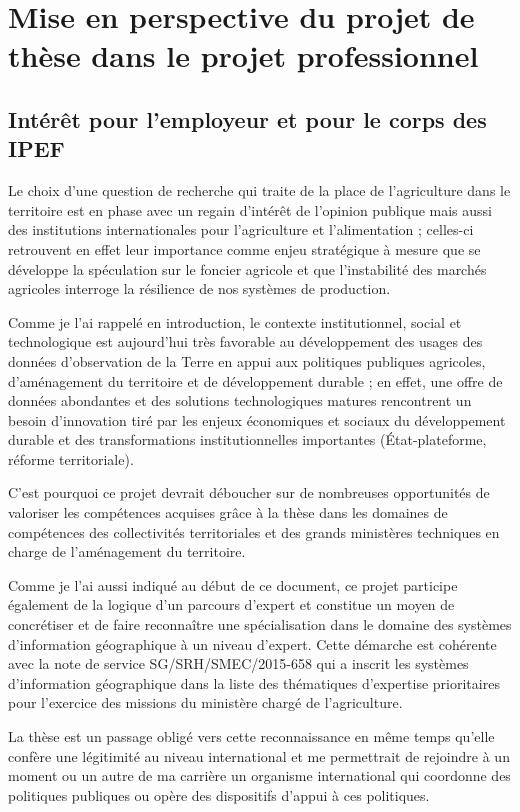 \section
{Mise en perspective du projet de thèse dans le projet professionnel}

\subsection
{Intérêt pour l'employeur et pour le corps des IPEF}

Le choix d'une question de recherche qui traite de la place de l'agriculture
dans le territoire est en phase avec un regain d'intérêt de l'opinion publique
mais aussi des institutions internationales pour l'agriculture et
l'alimentation ; celles-ci retrouvent en effet leur importance comme enjeu
stratégique à mesure que se développe la spéculation sur le foncier agricole
et que l'instabilité des marchés agricoles interroge la résilience de nos
systèmes de production.

Comme je l'ai rappelé en introduction, le contexte institutionnel, social et
technologique est aujourd'hui très favorable au développement des usages des
données d’observation de la Terre en appui aux politiques publiques agricoles,
d’aménagement du territoire et de développement durable ; en effet, une offre
de données abondantes et des solutions technologiques matures rencontrent un
besoin d'innovation tiré par les enjeux économiques et sociaux du
développement durable et des transformations institutionnelles importantes
(État-plateforme, réforme territoriale).

C'est pourquoi ce projet devrait déboucher sur de nombreuses opportunités de
valoriser les compétences acquises grâce à la thèse dans les domaines de
compétences des collectivités territoriales et des grands ministères
techniques en charge de l'aménagement du territoire.

Comme je l'ai aussi indiqué au début de ce document, ce projet participe
également de la logique d'un parcours d'expert et constitue un moyen de
concrétiser et de faire reconnaître une spécialisation dans le domaine des
systèmes d'information géographique à un niveau d'expert. Cette démarche est
cohérente avec la note de service SG/SRH/SMEC/2015-658 qui a inscrit les
systèmes d'information géographique dans la liste des thématiques d'expertise
prioritaires pour l'exercice des missions du ministère chargé de
l'agriculture.

La thèse est un passage obligé vers cette reconnaissance en même temps qu'elle
confère une légitimité au niveau international et me permettrait de rejoindre
à un moment ou un autre de ma carrière un organisme international qui
coordonne des politiques publiques ou opère des dispositifs d'appui à ces
politiques.

